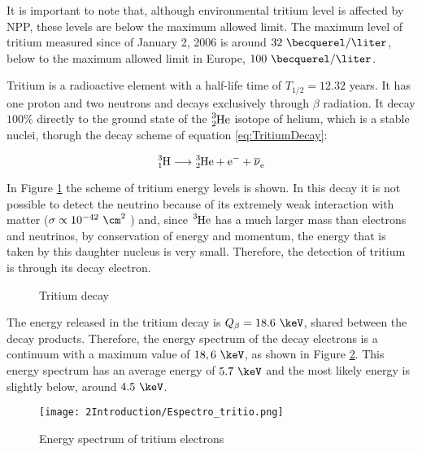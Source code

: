 It is important to note that, although environmental tritium level is affected by NPP, these levels are below the maximum allowed limit. The maximum level of tritium measured since of January 2, 2006 is around $32~\becquerel/\liter$, below to the maximum allowed limit in Europe, $100~\becquerel/\liter$.

Tritium is a radioactive element with a half-life time of $T_{1/2}= 12.32$ years. It has one proton and two neutrons and decays exclusively through $\beta$ radiation. It decay $100\%$ directly to the ground state of the $\ce{^{3}_{2}He}$ isotope of helium, which is a stable nuclei, thorugh the decay scheme of equation \ref{eq:TritiumDecay}:

\begin{equation}
\ce{^{3}_{1}H} \longrightarrow \ce{^{3}_{2}He}  + \ce{e^-}  + \ce{\overline{\nu}_e}
\label{eq:TritiumDecay}
\end{equation}

In Figure \ref{fig:TritiumDecay} the scheme of tritium energy levels is shown. In this decay it is not possible to detect the neutrino because of its extremely weak interaction with matter ($\sigma \propto 10^{-42} ~ \cm^2$ \cite{CrossSeccionNeutrino}) and, since $\ce{^{3}He}$ has a much larger mass than electrons and neutrinos, by conservation of energy and momentum, the energy that is taken by this daughter nucleus is very small. Therefore, the detection of tritium is through its decay electron. 

\begin{figure}[hbtp]
 \centering
 \caption{Tritium decay}
 \label{fig:TritiumDecay}
\end{figure}

The energy released in the tritium decay is $Q_\beta=18.6~\keV$, shared between the decay products. Therefore, the energy spectrum of the decay electrons is a continuum with a maximum value of $18,6~\keV$, as shown in Figure \ref{fig:TritiumDecaySpectrum}. This energy spectrum has an average energy of $5.7~\keV$ and the most likely energy is slightly below, around $4.5~\keV$.

\begin{figure}[hbtp]
\texttt{[image: 2Introduction/Espectro\_tritio.png]}
\centering
\caption{Energy spectrum of tritium electrons ~\cite{TritiumEspectrum}\label{fig:TritiumDecaySpectrum}}
\end{figure}

